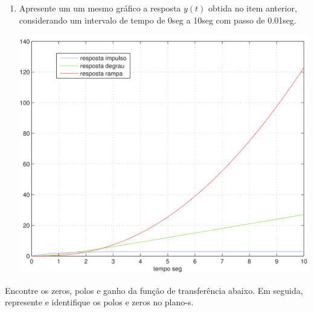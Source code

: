 \documentclass[paper=a4, fontsize=11pt]{article}
\begin{document}
\begin{list}{\textbf{Questão .}}{
\setlength{\labelwidth}{-2mm} \setlength{\parsep}{0mm}
\setlength{\topsep}{0mm} \setlength{\leftmargin}{0mm}}
\begin{enumerate}
           \begin{equation}
            y(t) = \frac{3 t^2}{2} - 3 t + 3 - 3 e^{-t}
        \end{equation}

            
            
         \item 
             Apresente um um mesmo gráfico a resposta $y(t)$  obtida no item anterior, 
             considerando um intervalo de tempo de 0seg a 10seg com passo de 0.01seg.
 
             \begin{center}
                \includegraphics[scale=0.15]{fig2q.png}
             \end{center}


    \end{enumerate}
    



\newpage

\item
    Encontre os zeros, polos e ganho da função de transferência abaixo. Em seguida, 
    represente e identifique os polos e zeros no plano-s.


\end{list}
\end{document}
